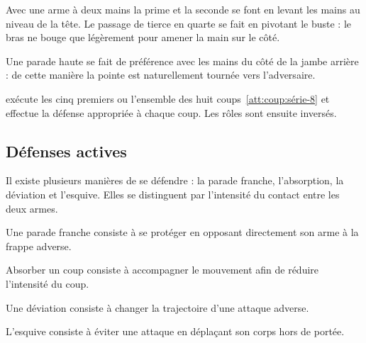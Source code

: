 Avec une arme à deux mains la prime et la seconde se font en levant les mains au niveau de la tête.
Le passage de tierce en quarte se fait en pivotant le buste : le bras ne bouge que légèrement pour amener la main sur le côté.

Une parade haute se fait de préférence avec les mains du côté de la jambe arrière : de cette manière la pointe est naturellement tournée vers l'adversaire.


\begin{exercice}
	\label{att:ex:série-défense}


	\A exécute les cinq premiers ou l'ensemble des huit coups~\ref{att:coup:série-8} et \D effectue la défense appropriée à chaque coup.
	Les rôles sont ensuite inversés.
\end{exercice}


\subsection{Défenses actives}


Il existe plusieurs manières de se défendre : la parade franche, l'absorption, la déviation et l'esquive.
Elles se distinguent par l'intensité du contact entre les deux armes.


\begin{definition}

	Une parade franche consiste à se protéger en opposant directement son arme à la frappe adverse.
\end{definition}


\begin{definition}[Absorption]

	Absorber un coup consiste à accompagner le mouvement afin de réduire l'intensité du coup.
\end{definition}


\begin{definition}[Déviation]

	Une déviation consiste à changer la trajectoire d'une attaque adverse.
\end{definition}


\begin{definition}[Esquive]

	L'esquive consiste à éviter une attaque en déplaçant son corps hors de portée.
\end{definition}


